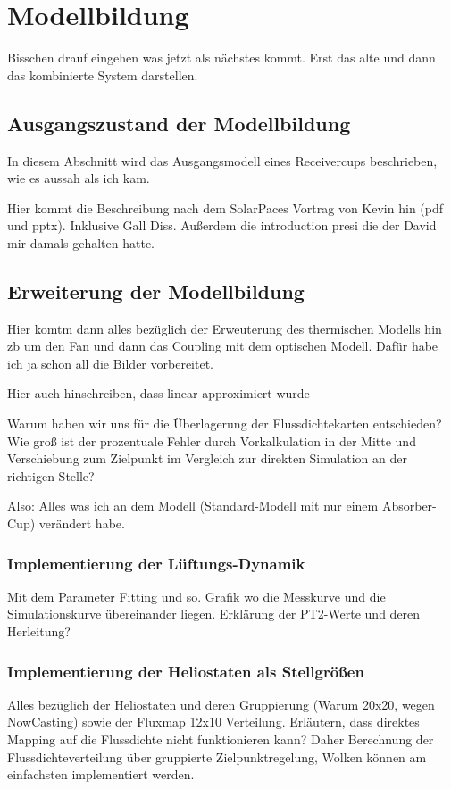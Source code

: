 \chapter{Modellbildung} \label{ch_Modellbildung}
Bisschen drauf eingehen was jetzt als nächstes kommt.
Erst das alte und dann das kombinierte System darstellen.

\section{Ausgangszustand der Modellbildung} \label{sec_Ausgangszustand}
In diesem Abschnitt wird das Ausgangsmodell eines Receivercups beschrieben, wie es aussah als ich kam.


Hier kommt die Beschreibung nach dem SolarPaces Vortrag von Kevin hin (pdf und pptx).
Inklusive Gall Diss. Außerdem die introduction presi die der David mir damals gehalten hatte.

\section{Erweiterung der Modellbildung} \label{sec_ErweiterungModellbildung}
Hier komtm dann alles bezüglich der Erweuterung des thermischen Modells hin zb um den Fan und dann das Coupling mit dem optischen Modell.
Dafür habe ich ja schon all die Bilder vorbereitet.


Hier auch hinschreiben, dass linear approximiert wurde

Warum haben wir uns für die Überlagerung der Flussdichtekarten entschieden?
Wie groß ist der prozentuale Fehler durch Vorkalkulation in der Mitte und Verschiebung zum Zielpunkt im Vergleich zur direkten Simulation an der richtigen Stelle?

Also: Alles was ich an dem Modell (Standard-Modell mit nur einem Absorber-Cup) verändert habe.

\subsection{Implementierung der Lüftungs-Dynamik} \label{subsec_ImplementierungFan}
Mit dem Parameter Fitting und so.
Grafik wo die Messkurve und die Simulationskurve übereinander liegen.
Erklärung der PT2-Werte und deren Herleitung?

\subsection{Implementierung der Heliostaten als Stellgrößen} \label{subsec_ImplementierungHeliostate}
Alles bezüglich der Heliostaten und deren Gruppierung (Warum 20x20, wegen NowCasting) sowie der Fluxmap 12x10 Verteilung.
Erläutern, dass direktes Mapping auf die Flussdichte nicht funktionieren kann?
Daher Berechnung der Flussdichteverteilung über gruppierte Zielpunktregelung, Wolken können am einfachsten implementiert werden.